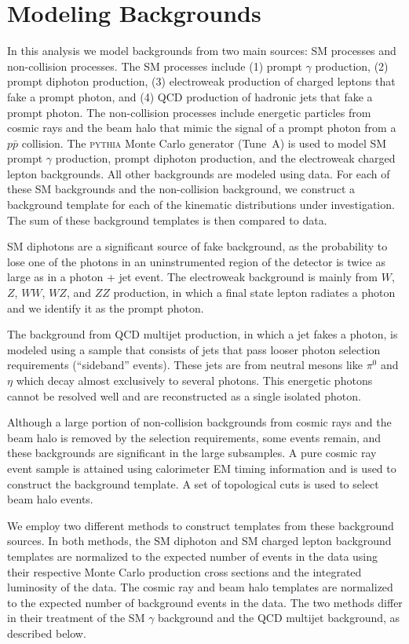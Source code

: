 \documentclass[12pt,twoside,letterpaper,doublespace]{article}
\begin{document}
\section{Modeling Backgrounds}\label{sec:modeling}
In this analysis we model backgrounds from two main sources:  SM processes and non-collision processes.  The SM processes include (1) prompt $\gamma$ production, (2) prompt diphoton production, (3) electroweak production of charged leptons that fake a prompt photon, and (4) QCD production of hadronic jets that fake a prompt photon.  The non-collision processes include energetic particles from cosmic rays and the beam halo that mimic the signal of a prompt photon from a $p\bar{p}$ collision. The \textsc{pythia} Monte Carlo generator (Tune~A) \cite{ref:pythia} is used to model SM prompt $\gamma$ production, prompt diphoton production, and the electroweak charged lepton backgrounds.  All other backgrounds are modeled using data.  For each of these SM backgrounds and the non-collision background, we construct a background template for each of the kinematic distributions under investigation.  The sum of these background templates is then compared to data.

SM diphotons are a significant source of fake \met background, as the probability to lose one of the photons in an uninstrumented region of the detector is twice as large as in a photon + jet event. The electroweak background is mainly from $W$, $Z$, $WW$, $WZ$, and $ZZ$ production, in which a final state lepton radiates a photon and we identify it as the prompt photon.

The background from QCD multijet production, in which a jet fakes a photon, is modeled using a sample that consists of jets that pass looser photon selection requirements (``sideband'' events). These jets are from neutral mesons like  $\pi^{0}$ and $\eta$ which decay almost exclusively to several photons. This energetic photons cannot be resolved well and are reconstructed as a single isolated photon.

Although a large portion of non-collision backgrounds from cosmic rays and the beam halo is removed by the \phojets selection requirements, some events remain, and these backgrounds are significant in the large \met subsamples. A pure cosmic ray event sample is attained using calorimeter EM timing information and is used to construct the background template. A set of topological cuts is used to select beam halo events.

We employ two different methods to construct templates from these background sources.  In both methods, the SM diphoton and SM charged lepton background templates are normalized to the expected number of events in the \phojets data using their respective Monte Carlo production cross sections and the integrated luminosity of the data. The cosmic ray and beam halo templates are normalized to the expected number of background events in the \phojets data.  The two methods differ in their treatment of the SM $\gamma$ background and the QCD multijet background, as described below.
\end{document}
